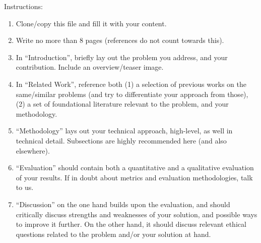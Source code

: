 \documentclass[11pt]{article}
\begin{document}
Instructions: 
\begin{enumerate}
    \item Clone/copy this file and fill it with your content.
    \item Write no more than 8 pages (references do not count towards this).
    \item In ``Introduction'', briefly lay out the problem you address, and your contribution. Include an overview/teaser image.
    \item In ``Related Work'', reference both (1) a selection of previous works on the same/similar problems (and try to differentiate your approach from those), (2) a set of foundational literature relevant to the problem, and your methodology.
    \item ``Methodology'' lays out your technical approach, high-level, as well in technical detail. Subsections are highly recommended here (and also elsewhere).
    \item ``Evaluation'' should contain both a quantitative and a qualitative evaluation of your results. If in doubt about metrics and evaluation methodologies, talk to us.
    \item ``Discussion'' on the one hand builds upon the evaluation, and should critically discuss strengths and weaknesses of your solution, and possible ways to improve it further. On the other hand, it should discuss relevant ethical questions related to the problem and/or your solution at hand.
\end{enumerate}


% 
\end{document}
